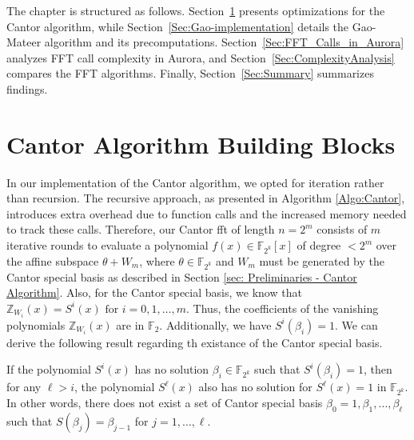 \begin{itemize}
	
\end{itemize}



 The chapter is structured as follows.  Section~\ref{Sec:Cantor Implementation} presents optimizations for the Cantor algorithm, while Section~\ref{Sec:Gao-implementation} details the Gao-Mateer algorithm and its precomputations. Section~\ref{Sec:FFT_Calls_in_Aurora} analyzes FFT call complexity in Aurora, and Section~\ref{Sec:ComplexityAnalysis} compares the FFT algorithms. Finally, Section~\ref{Sec:Summary} summarizes findings.


\section{Cantor Algorithm Building Blocks}\label{Sec:Cantor Implementation}

In our implementation of the Cantor algorithm, we opted for iteration rather than recursion. The recursive approach, as presented in Algorithm \ref{Algo:Cantor}, introduces extra overhead due to function calls and the increased memory needed to track these calls. Therefore, our Cantor \gls{fft} of length $n = 2^m$ consists of $m$ iterative rounds to evaluate a polynomial $f(x)\in\mathbb{F}_{2^k}[x]$ of degree $<2^m$ over the affine subspace $\theta + W_m$, where $\theta \in \mathbb{F}_{2^k}$ and $W_m$ must be generated by the Cantor special basis as described in Section \ref{sec: Preliminaries - Cantor Algorithm}. Also, for the Cantor special basis, we know that $\mathbb{Z}_{W_{i}}(x)=S^{i}(x) \text{ for } i=0,1,\ldots,m$. Thus, the coefficients of the vanishing polynomials $\mathbb{Z}_{W_{i}}(x)$ are in $\mathbb{F}_2$. Additionally, we have $S^{i}(\beta_{i}) = 1$. We can derive the following result regarding th existance of the Cantor special basis.

\begin{theorem}
	If the polynomial $S^{i}(x)$ has no solution $\beta_{i} \in \mathbb{F}_{2^k}$ such that $S^i(\beta_i) = 1$, then for any $\ell > i$, the polynomial $S^{\ell}(x)$ also has no solution for $S^{\ell}(x) = 1$ in $\mathbb{F}_{2^k}$. In other words, there does not exist a set of Cantor special basis ${\beta_0=1, \beta_1, \ldots, \beta_{\ell}}$ such that $S(\beta_j) = \beta_{j-1}$ for $j=1,\ldots,\ell$.
 \end{theorem}


